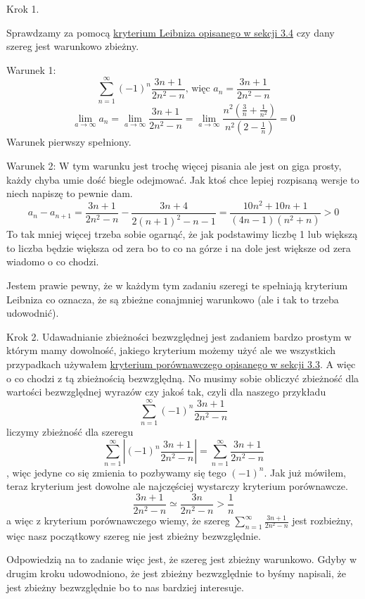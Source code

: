 \documentclass[11pt]{article}
\begin{document}
\begin{list}{}{}
    \item[Krok 1.] {
        Sprawdzamy za pomocą \hyperlink{subsection.3.4}{kryterium Leibniza opisanego w sekcji 3.4} czy 
        dany szereg jest warunkowo zbieżny.

        Warunek 1: 
        \[
            \sum_{n = 1}^{\infty} (-1)^n \frac{3n + 1}{2n^2 - n} \text{, więc }
            a_n = \frac{3n + 1}{2n^2 - n}
        \]
        \[
            \lim_{a \to \infty}a_n = \lim_{a \to \infty}\frac{3n + 1}{2n^2 - n} =
            \lim_{a \to \infty}\frac{n^2(\frac{3}{n}+ \frac{1}{n^2})}{n^2(2 - \frac{1}{n})} = 0
        \]
        Warunek pierwszy spełniony.

        Warunek 2:
        W tym warunku jest trochę więcej pisania ale jest on giga prosty, każdy chyba
        umie dość biegle odejmować. Jak ktoś chce lepiej rozpisaną wersje to niech napiszę to
        pewnie dam. 
        \[
            a_n - a_{n + 1} = \frac{3n + 1}{2n^2 - n} - \frac{3n + 4}{2(n+1)^2 - n - 1} = 
            \frac{10n^2 + 10n + 1}{(4n - 1)(n^2 + n)} > 0
        \]
        To tak mniej więcej trzeba sobie ogarnąć, że jak podstawimy liczbę 1 lub większą to 
        liczba będzie większa od zera bo to co na górze i na dole jest większe od zera wiadomo o co chodzi.

        Jestem prawie pewny, że w każdym tym zadaniu szeregi te spełniają kryterium Leibniza
        co oznacza, że są zbieżne conajmniej warunkowo (ale i tak to trzeba udowodnić).
    }
    \item[Krok 2.]{
        Udawadnianie zbieżności bezwzględnej jest zadaniem bardzo prostym w którym mamy dowolność,
        jakiego kryterium możemy użyć ale we wszystkich przypadkach używałem 
        \hyperlink{subsection.3.3}{kryterium porównawczego opisanego w sekcji 3.3}. A więc 
        o co chodzi z tą zbieżnością bezwzględną. No musimy sobie obliczyć zbieżność dla wartości
        bezwzględnej wyrazów czy jakoś tak, czyli dla naszego przykładu
        \[
            \sum_{n = 1}^{\infty} (-1)^n \frac{3n + 1}{2n^2 - n}
        \]
        liczymy zbieżność dla szeregu
        \[
            \sum_{n = 1}^{\infty} \left\lvert(-1)^n \frac{3n + 1}{2n^2 - n}\right\rvert
            = \sum_{n = 1}^{\infty} \frac{3n + 1}{2n^2 - n}
        \]
        , więc jedyne co się zmienia to pozbywamy się tego $(-1)^n$. Jak już mówiłem, teraz kryterium
        jest dowolne ale najczęściej wystarczy kryterium porównawcze.
        \[
            \frac{3n + 1}{2n^2 - n} \simeq \frac{3n}{2n^2 - n} > \frac{1}{n}
        \]
        a więc z kryterium porównawczego wiemy, że szereg $\sum_{n = 1}^{\infty} \frac{3n + 1}{2n^2 - n}$ jest
        rozbieżny, więc nasz początkowy szereg nie jest zbieżny bezwzględnie.
    }
\end{list}
Odpowiedzią na to zadanie więc jest, że szereg jest zbieżny warunkowo. Gdyby 
w drugim kroku udowodniono, że jest zbieżny bezwzględnie to byśmy napisali, że jest
zbieżny bezwzględnie bo to nas bardziej interesuje.
\end{document}
